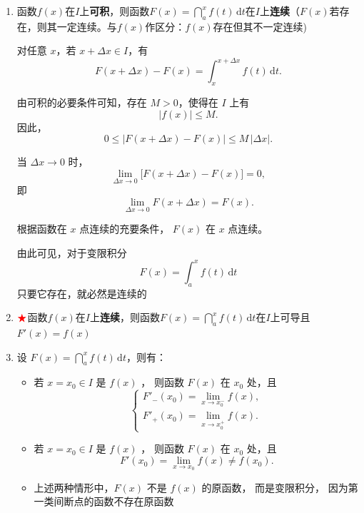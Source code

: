 \documentclass[../book.tex]{subfiles}
\begin{document}
    \begin{enumerate}
        \item 函数$f(x)$在$I$上\textbf{可积}，则函数$F(x) = \dint_a^x f(t)\,\mathrm{d}t$在$I$上\textbf{连续}（$F(x)$若存在，则其一定连续。与$f(x)$作区分：$f(x)$存在但其不一定连续)
        \begin{analysisbox}[证（理解）：]
            对任意 $x$，若 $x+\Delta x \in I$，有
            \[
                F(x+\Delta x)-F(x)
                =
                \int_x^{x+\Delta x} f(t)\,\mathrm{d}t.
            \]

            由可积的必要条件可知，存在 $M>0$，使得在 $I$ 上有
            \[
                |f(x)| \le M.
            \]
            因此，
            \[
                0 \le \bigl| F(x+\Delta x)-F(x) \bigr|
                \le
                M\,|\Delta x|.
            \]

            当 $\Delta x \to 0$ 时，
            \[
                \lim_{\Delta x \to 0}
                \bigl[ F(x+\Delta x)-F(x) \bigr]
                =
                0,
            \]
            即
            \[
                \lim_{\Delta x \to 0} F(x+\Delta x) = F(x).
            \]

            根据函数在 $x$ 点连续的充要条件，
            $F(x)$ 在 $x$ 点连续。

            由此可见，对于变限积分
            \[
                F(x)=\int_a^x f(t)\,\mathrm{d}t
            \]
            只要它存在，就必然是连续的
        \end{analysisbox}
        \item $\color{red}{\bigstar}$函数$f(x)$在$I$上\textbf{连续}，则函数$F(x) = \dint_a^x f(t)\,\mathrm{d}t$在$I$上可导且$F'(x) = f(x)$
        \item 设 $F(x)=\dint_a^x f(t)\,\mathrm{d}t$，则有：
        \begin{itemize}
            \item 若 $x=x_0\in I$ 是 $f(x)$ {}，
            则函数 $F(x)$ 在 $x_0$ 处{\color[rgb]{0.2,0.6,0.3}{不可导}}，且
            \[
                \begin{cases}
                    F'_-(x_0)=\lim\limits_{x\to x_0^-} f(x),\\
                    F'_+(x_0)=\lim\limits_{x\to x_0^+} f(x).
                \end{cases}
            \]

            \item 若 $x=x_0\in I$ 是 $f(x)$ {}，
            则函数 $F(x)$ 在 $x_0$ 处{\color[rgb]{0.2,0.6,0.3}{可导}}，且
            \[
                F'(x_0)=\lim\limits_{x\to x_0} f(x)\ne f(x_0).
            \]

            \item 上述两种情形中，$F(x)$ 不是 $f(x)$ 的原函数，
            而是变限积分，
            因为第一类间断点的函数不存在原函数
        \end{itemize}
    \end{enumerate}
\end{document}
